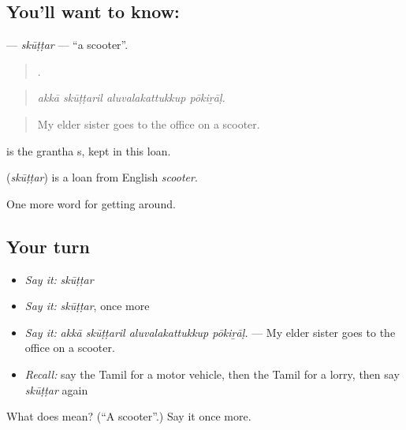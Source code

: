 \subsection*{You'll want to know: }
\textbf{} — \emph{skūṭṭar} — \textquotedblleft{}a scooter\textquotedblright{}.

\begin{quote}
   .
\end{quote}

\begin{quote}
\emph{akkā skūṭṭaril aluvalakattukkup pōkiṟāḷ.}
\end{quote}

\begin{quote}
My elder sister goes to the office on a scooter.
\end{quote}

 is the grantha s, kept in this loan.

\begin{cousinweb}
\textbf{} (\emph{skūṭṭar}) is a loan from English \emph{scooter}.
\end{cousinweb}

\begin{grammarlens}[title={What you've built}]
One more word for getting around.
\end{grammarlens}

\subsection*{Your turn}
\begin{itemize}
\raggedright
  \item \emph{Say it:} \emph{skūṭṭar}
  \item \emph{Say it:} \emph{skūṭṭar}, once more
  \item \emph{Say it:} \emph{akkā skūṭṭaril aluvalakattukkup pōkiṟāḷ.} — My elder sister goes to the office on a scooter.
  \item \emph{Recall:} say the Tamil for a motor vehicle, then the Tamil for a lorry, then say \emph{skūṭṭar} again
\end{itemize}

\begin{tcolorbox}[breakable,colback=teal!4,colframe=teal!35!black,title={Before you move on}]
What does  mean? (\textquotedblleft{}A scooter\textquotedblright{}.) Say it once more.
\end{tcolorbox}
